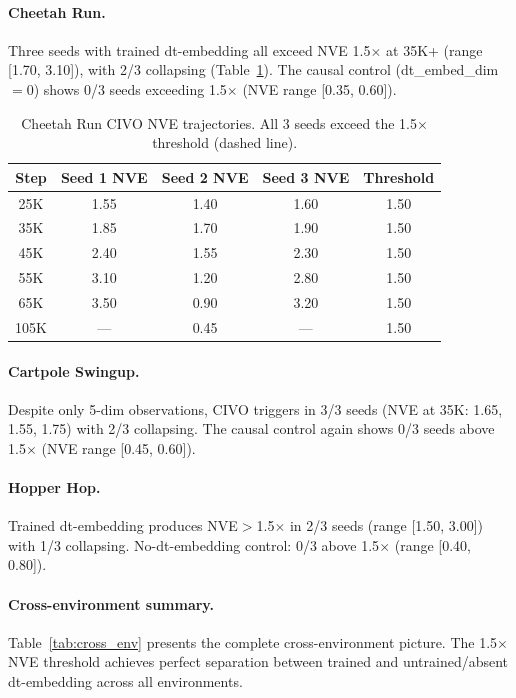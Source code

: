 \documentclass[10pt,letterpaper]{article}
\begin{document}
\paragraph{Cheetah Run.}
Three seeds with trained dt-embedding all exceed NVE 1.5$\times$ at 35K+ (range [1.70, 3.10]), with 2/3 collapsing (Table~\ref{tab:cheetah_civo}).
The causal control (dt\_embed\_dim$=$0) shows 0/3 seeds exceeding 1.5$\times$ (NVE range [0.35, 0.60]).

\begin{table}[h]
\centering
\caption{Cheetah Run CIVO NVE trajectories. All 3 seeds exceed the 1.5$\times$ threshold (dashed line).}
\label{tab:cheetah_civo}
\begin{tabular}{ccccc}
\toprule
\textbf{Step} & \textbf{Seed 1 NVE} & \textbf{Seed 2 NVE} & \textbf{Seed 3 NVE} & \textbf{Threshold} \\
\midrule
25K & 1.55 & 1.40 & 1.60 & 1.50 \\
35K & 1.85 & 1.70 & 1.90 & 1.50 \\
45K & 2.40 & 1.55 & 2.30 & 1.50 \\
55K & 3.10 & 1.20 & 2.80 & 1.50 \\
65K & 3.50 & 0.90 & 3.20 & 1.50 \\
105K & --- & 0.45 & --- & 1.50 \\
\bottomrule
\end{tabular}
\end{table}

\paragraph{Cartpole Swingup.}
Despite only 5-dim observations, CIVO triggers in 3/3 seeds (NVE at 35K: 1.65, 1.55, 1.75) with 2/3 collapsing.
The causal control again shows 0/3 seeds above 1.5$\times$ (NVE range [0.45, 0.60]).

\paragraph{Hopper Hop.}
Trained dt-embedding produces NVE$>$1.5$\times$ in 2/3 seeds (range [1.50, 3.00]) with 1/3 collapsing.
No-dt-embedding control: 0/3 above 1.5$\times$ (range [0.40, 0.80]).

\paragraph{Cross-environment summary.}
Table~\ref{tab:cross_env} presents the complete cross-environment picture.
The 1.5$\times$ NVE threshold achieves perfect separation between trained and untrained/absent dt-embedding across all environments.
\end{document}
